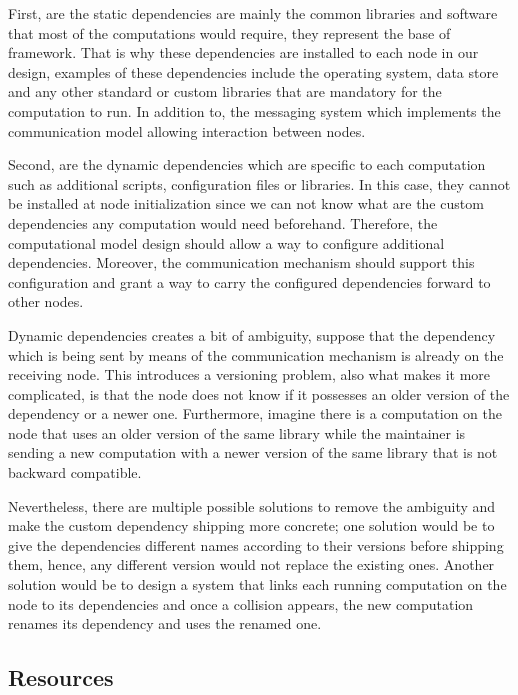 First, are the static dependencies are mainly the common libraries and software that most of the computations would require, they represent the base of framework. That is why these dependencies are installed to each node in our design, examples of these dependencies include the operating system, data store and any other standard or custom libraries that are mandatory for the computation to run. In addition to, the messaging system which implements the communication model allowing interaction between nodes. 

 Second, are the dynamic dependencies which are specific to each computation such as additional scripts, configuration files or libraries. In this case, they cannot be installed at node initialization since we can not know what are the custom dependencies any computation would need beforehand. Therefore, the computational model design should allow a way to configure additional dependencies. Moreover, the communication mechanism should support this configuration and grant a way to carry the configured dependencies forward to other nodes.
 
 
  Dynamic dependencies creates a bit of ambiguity, suppose that the dependency which is being sent by means of the communication mechanism is already on the receiving node. This introduces a  versioning problem, also what makes it more complicated, is that the node does not know if it possesses an older version of the dependency or a newer one. Furthermore,  imagine there is a computation on the node that uses an older version of the same library while the maintainer is sending a new computation with a newer version of the same library that is not backward compatible. 
  
   Nevertheless, there are multiple possible solutions to remove the ambiguity and make the custom dependency shipping more concrete; one solution would be to give the dependencies different names according to their versions before shipping them, hence, any different version would not replace the existing ones. Another solution would be to design a system that links each running computation on the node to its dependencies and once a collision appears, the new computation renames its dependency and uses the renamed one.
 

\subsection {Resources}


